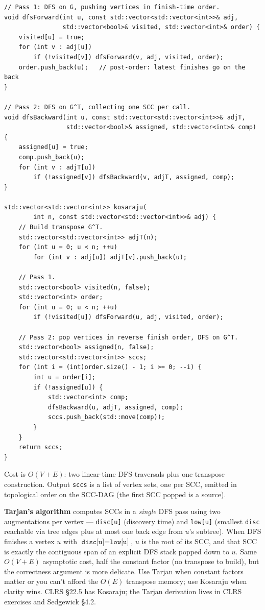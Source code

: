 \documentclass[11pt]{article}
\begin{document}
\begin{lstlisting}[basicstyle=\ttfamily\small,frame=single]
// Pass 1: DFS on G, pushing vertices in finish-time order.
void dfsForward(int u, const std::vector<std::vector<int>>& adj,
                std::vector<bool>& visited, std::vector<int>& order) {
    visited[u] = true;
    for (int v : adj[u])
        if (!visited[v]) dfsForward(v, adj, visited, order);
    order.push_back(u);   // post-order: latest finishes go on the back
}

// Pass 2: DFS on G^T, collecting one SCC per call.
void dfsBackward(int u, const std::vector<std::vector<int>>& adjT,
                 std::vector<bool>& assigned, std::vector<int>& comp) {
    assigned[u] = true;
    comp.push_back(u);
    for (int v : adjT[u])
        if (!assigned[v]) dfsBackward(v, adjT, assigned, comp);
}

std::vector<std::vector<int>> kosaraju(
        int n, const std::vector<std::vector<int>>& adj) {
    // Build transpose G^T.
    std::vector<std::vector<int>> adjT(n);
    for (int u = 0; u < n; ++u)
        for (int v : adj[u]) adjT[v].push_back(u);

    // Pass 1.
    std::vector<bool> visited(n, false);
    std::vector<int> order;
    for (int u = 0; u < n; ++u)
        if (!visited[u]) dfsForward(u, adj, visited, order);

    // Pass 2: pop vertices in reverse finish order, DFS on G^T.
    std::vector<bool> assigned(n, false);
    std::vector<std::vector<int>> sccs;
    for (int i = (int)order.size() - 1; i >= 0; --i) {
        int u = order[i];
        if (!assigned[u]) {
            std::vector<int> comp;
            dfsBackward(u, adjT, assigned, comp);
            sccs.push_back(std::move(comp));
        }
    }
    return sccs;
}
\end{lstlisting}

Cost is $O(V + E)$: two linear-time DFS traversals plus one
transpose construction. Output \texttt{sccs} is a list of vertex
sets, one per SCC, emitted in topological order on the SCC-DAG (the
first SCC popped is a source).

\begin{notebox}
\textbf{Tarjan's algorithm} computes SCCs in a \emph{single} DFS
pass using two augmentations per vertex --- \texttt{disc[u]}
(discovery time) and \texttt{low[u]} (smallest \texttt{disc}
reachable via tree edges plus at most one back edge from $u$'s
subtree). When DFS finishes a vertex $u$ with
$\texttt{disc[u]} = \texttt{low[u]}$, $u$ is the root of its SCC,
and that SCC is exactly the contiguous span of an explicit DFS
stack popped down to $u$. Same $O(V + E)$ asymptotic cost, half the
constant factor (no transpose to build), but the correctness
argument is more delicate. Use Tarjan when constant factors matter
or you can't afford the $O(E)$ transpose memory; use Kosaraju when
clarity wins. CLRS \S22.5 has Kosaraju; the Tarjan derivation lives
in CLRS exercises and Sedgewick \S4.2.
\end{notebox}
\end{document}
